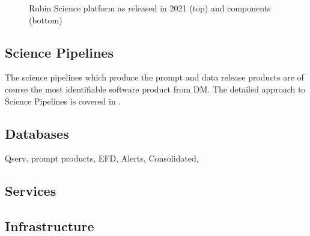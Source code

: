 \begin{figure}
\caption{Rubin Science platform as released in 2021 (top) and components (bottom) \label{fig:sciplat}}
\end{figure}

\subsection{Science Pipelines}\label{sec:pipes}
The science pipelines which produce the prompt and data release products are of course the most identifiable
software product from DM.
The detailed approach to Science Pipelines is covered in \citet{PSTN-019}.


\subsection{Databases}
Qserv, prompt products, EFD, Alerts, Consolidated,

\subsection{Services}

\subsection{Infrastructure}
